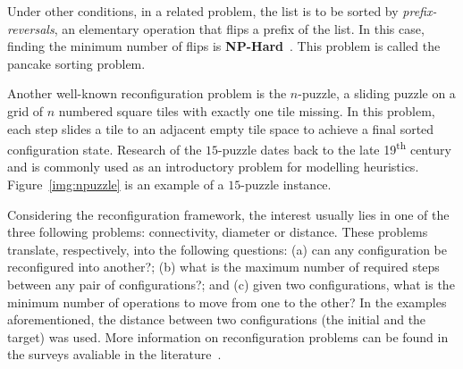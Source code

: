 \documentclass[msc,english,table,xcdraw]{ppgccufmg}
\begin{document}

Under other conditions, in a related problem, the list is to be sorted by \textit{prefix-reversals}, an elementary operation that flips a prefix of the list. In this case, finding the 
minimum number of flips is \textbf{NP-Hard}~\cite{Bulteau:2015}.
This problem is called the pancake sorting problem.


Another well-known reconfiguration problem is the $n$-puzzle, a sliding puzzle on a grid of $n$ numbered square tiles with exactly one tile missing.
In this problem, each step slides a tile to an adjacent empty tile space to achieve a final sorted configuration state.
Research of the $15$-puzzle dates back to the late 
19\textsuperscript{th} century~\cite{Johnson:1879} and is commonly used as an introductory problem for modelling heuristics.
Figure~\ref{img:npuzzle} is an example of a $15$-puzzle instance.


Considering the reconfiguration framework, the interest usually lies in one of the three following problems: connectivity, diameter or distance. These problems translate, respectively, into the following questions: (a) can any configuration be reconfigured into another?; (b) what is the maximum number of required steps between any pair of configurations?; and (c) given two configurations, what is the minimum number of operations to move from one to the other?
In the examples aforementioned, the distance between two configurations (the initial and the target) was used.
More information on reconfiguration 
problems can be found in the surveys avaliable in the literature~\cite
{Heuvel:2013,Mouawad:2015,Naomi:2018}.
\end{document}
